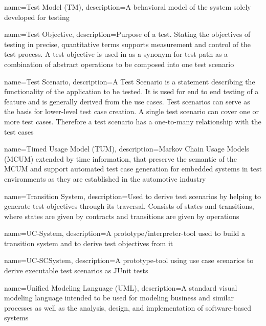 {
	name={Test Model (TM)},
	description={A behavioral model of the system solely developed for testing \cite{Paper1}}
}

{
	name={Test Objective},
	description={Purpose of a test. Stating the objectives of testing in precise, quantitative terms supports measurement and control of the test process. A test objective is used in \cite{ClementineNebut2006} as a synonym for test path as a combination of abstract operations to be composed into one test scenario \cite{SWEBOK, ClementineNebut2006}}
}

{
	name={Test Scenario},
	description={A Test Scenario is a statement describing the functionality of the application to be tested. It is used for end to end testing of a feature and is generally derived from the use cases. Test scenarios can serve as the basis for lower-level test case creation. A single test scenario can cover one or more test cases. Therefore a test scenario has a one-to-many relationship with the test cases \cite{AOTTestScenario}}
}

{
	name={Timed Usage Model (TUM)},
	description={Markov Chain Usage Models (MCUM) extended by time information, that preserve the semantic of the MCUM and support automated test case generation for embedded systems in test environments as they are established in the automotive industry \cite{Siegl2010}}
}

{
	name={Transition System},
	description={Used to derive test scenarios by helping to generate test objectives through its traversal. Consists of states and transitions, where states are given by contracts and transitions are given by operations \cite{ClementineNebut2006}}
}

{
	name={UC-System},
	description={A prototype/interpreter-tool used to build a transition system and to derive test objectives from it \cite{ClementineNebut2006}}
}

{
	name={UC-SCSystem},
	description={A prototype-tool using use case scenarios to derive executable test scenarios as JUnit tests \cite{ClementineNebut2006}}
}

{
	name={Unified Modeling Language (UML)},
	description={A standard visual modeling language intended to be used for modeling business and similar processes as well as the analysis, design, and implementation of software-based systems \cite{UML}}
}

